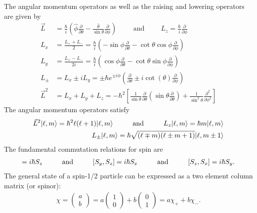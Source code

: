 The angular momentum operators as well as the raising and lowering operators are given by
\begin{align}
	\vec{L} &= \frac{\hbar}{i}\left(\hat{\phi}\frac{\partial}{\partial \theta}- \frac{\hat{\theta}}{\sin \theta}\frac{\partial}{\partial \phi}\right) \hspace{1cm} \textrm{and} \hspace{1cm} L_z =\frac{\hbar}{i} \frac{\partial}{\partial \phi}\\
	L_x &= \frac{L_++L_-}{2}= \frac{\hbar}{i}\left(-\sin\phi \frac{\partial}{\partial \theta}-\cot\theta \cos \phi \frac{\partial}{\partial \phi}\right) \\  L_y &= \frac{L_+-L_-}{2i}= \frac{\hbar}{i}\left(\cos\phi \frac{\partial}{\partial \theta}-\cot\theta \sin \phi \frac{\partial}{\partial \phi}\right) \\
	L_{\pm} &= L_x\pm i L_y = \pm \hbar e^{\pm i \phi} \left(\frac{\partial}{\partial \theta}\pm  i \cot(\theta)\frac{\partial}{\partial \phi}\right) \\
	\vec{L}^2 &= L_x+L_y+L_z =-\hbar^2 \left[\frac{1}{\sin\theta}\frac{\partial}{\partial \theta}\left(\sin\theta\frac{\partial }{\partial \theta}\right)+\frac{1}{\sin^2\theta}\frac{\partial^2}{\partial \phi^2}\right]
\end{align}
The angular momentum operators satisfy
\begin{align}
	\vec{L}^2 | \ell, m \rangle = \hbar^2\ell(\ell+1)| \ell, m \rangle \andspace{1cm} L_z| \ell, m \rangle = \hbar m | \ell, m \rangle \\
	L_{\pm} | \ell, m \rangle = \hbar \sqrt{(\ell \mp m)(\ell \pm m +1)} | \ell, m \pm 1 \rangle
\end{align}
The fundamental commutation relations for spin are
\begin{align}
[S_x,S_y]=i\hbar S_z \andspace{1cm} [S_y,S_z]=i\hbar S_x \andspace{1cm} [S_z,S_x]=i\hbar S_y.
\end{align}
The general state of a spin-1/2 particle can be expressed as a two element column matrix (or spinor):
\begin{align}
\chi= \begin{pmatrix}
a\\b
\end{pmatrix} = a \begin{pmatrix}
1\\0
\end{pmatrix}+b\begin{pmatrix}
0\\1
\end{pmatrix}= a \chi_++b\chi_-.
\end{align}
